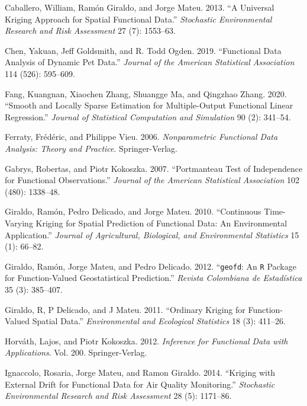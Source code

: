 \documentclass[12pt,]{article}
\theoremstyle{definition}
\theoremstyle{definition}
\theoremstyle{definition}
\theoremstyle{remark}
\begin{document}
\leavevmode\hypertarget{ref-caballero2013universal}{}%
Caballero, William, Ramón Giraldo, and Jorge Mateu. 2013. ``A Universal Kriging Approach for Spatial Functional Data.'' \emph{Stochastic Environmental Research and Risk Assessment} 27 (7): 1553--63.

\leavevmode\hypertarget{ref-chen2018}{}%
Chen, Yakuan, Jeff Goldsmith, and R. Todd Ogden. 2019. ``Functional Data Analysis of Dynamic Pet Data.'' \emph{Journal of the American Statistical Association} 114 (526): 595--609.

\leavevmode\hypertarget{ref-kuangman2020}{}%
Fang, Kuangnan, Xiaochen Zhang, Shuangge Ma, and Qingzhao Zhang. 2020. ``Smooth and Locally Sparse Estimation for Multiple-Output Functional Linear Regression.'' \emph{Journal of Statistical Computation and Simulation} 90 (2): 341--54.

\leavevmode\hypertarget{ref-ferraty2006nonparametric}{}%
Ferraty, Frédéric, and Philippe Vieu. 2006. \emph{Nonparametric Functional Data Analysis: Theory and Practice}. Springer-Verlag.

\leavevmode\hypertarget{ref-gabrys2007portmanteau}{}%
Gabrys, Robertas, and Piotr Kokoszka. 2007. ``Portmanteau Test of Independence for Functional Observations.'' \emph{Journal of the American Statistical Association} 102 (480): 1338--48.

\leavevmode\hypertarget{ref-giraldo2010continuous}{}%
Giraldo, Ramón, Pedro Delicado, and Jorge Mateu. 2010. ``Continuous Time-Varying Kriging for Spatial Prediction of Functional Data: An Environmental Application.'' \emph{Journal of Agricultural, Biological, and Environmental Statistics} 15 (1): 66--82.

\leavevmode\hypertarget{ref-giraldo2012geofd}{}%
Giraldo, Ramón, Jorge Mateu, and Pedro Delicado. 2012. ``\texttt{geofd}: An \texttt{R} Package for Function-Valued Geostatistical Prediction.'' \emph{Revista Colombiana de Estadística} 35 (3): 385--407.

\leavevmode\hypertarget{ref-giraldo2011ordinary}{}%
Giraldo, R, P Delicado, and J Mateu. 2011. ``Ordinary Kriging for Function-Valued Spatial Data.'' \emph{Environmental and Ecological Statistics} 18 (3): 411--26.

\leavevmode\hypertarget{ref-horvath2012inference}{}%
Horváth, Lajos, and Piotr Kokoszka. 2012. \emph{Inference for Functional Data with Applications}. Vol. 200. Springer-Verlag.

\leavevmode\hypertarget{ref-ignaccolo2014kriging}{}%
Ignaccolo, Rosaria, Jorge Mateu, and Ramon Giraldo. 2014. ``Kriging with External Drift for Functional Data for Air Quality Monitoring.'' \emph{Stochastic Environmental Research and Risk Assessment} 28 (5): 1171--86.
\end{document}
